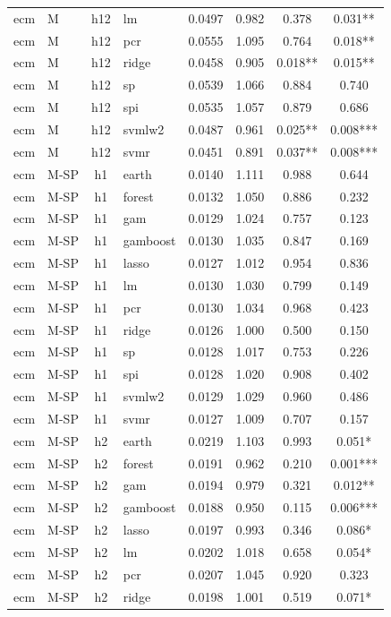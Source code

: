 \begin{ThreePartTable}
\begin{longtable}[t]{llclcccc}
ecm & M & h12 & lm & 0.0497 & 0.982 & 0.378 & 0.031**\\
ecm & M & h12 & pcr & 0.0555 & 1.095 & 0.764 & 0.018**\\
ecm & M & h12 & ridge & 0.0458 & 0.905 & 0.018** & 0.015**\\
ecm & M & h12 & sp & 0.0539 & 1.066 & 0.884 & 0.740\\
ecm & M & h12 & spi & 0.0535 & 1.057 & 0.879 & 0.686\\
ecm & M & h12 & svmlw2 & 0.0487 & 0.961 & 0.025** & 0.008***\\
ecm & M & h12 & svmr & 0.0451 & 0.891 & 0.037** & 0.008***\\
\addlinespace
ecm & M-SP & h1 & earth & 0.0140 & 1.111 & 0.988 & 0.644\\
ecm & M-SP & h1 & forest & 0.0132 & 1.050 & 0.886 & 0.232\\
ecm & M-SP & h1 & gam & 0.0129 & 1.024 & 0.757 & 0.123\\
ecm & M-SP & h1 & gamboost & 0.0130 & 1.035 & 0.847 & 0.169\\
ecm & M-SP & h1 & lasso & 0.0127 & 1.012 & 0.954 & 0.836\\
ecm & M-SP & h1 & lm & 0.0130 & 1.030 & 0.799 & 0.149\\
ecm & M-SP & h1 & pcr & 0.0130 & 1.034 & 0.968 & 0.423\\
ecm & M-SP & h1 & ridge & 0.0126 & 1.000 & 0.500 & 0.150\\
ecm & M-SP & h1 & sp & 0.0128 & 1.017 & 0.753 & 0.226\\
ecm & M-SP & h1 & spi & 0.0128 & 1.020 & 0.908 & 0.402\\
ecm & M-SP & h1 & svmlw2 & 0.0129 & 1.029 & 0.960 & 0.486\\
ecm & M-SP & h1 & svmr & 0.0127 & 1.009 & 0.707 & 0.157\\
\addlinespace
ecm & M-SP & h2 & earth & 0.0219 & 1.103 & 0.993 & 0.051*\\
ecm & M-SP & h2 & forest & 0.0191 & 0.962 & 0.210 & 0.001***\\
ecm & M-SP & h2 & gam & 0.0194 & 0.979 & 0.321 & 0.012**\\
ecm & M-SP & h2 & gamboost & 0.0188 & 0.950 & 0.115 & 0.006***\\
ecm & M-SP & h2 & lasso & 0.0197 & 0.993 & 0.346 & 0.086*\\
ecm & M-SP & h2 & lm & 0.0202 & 1.018 & 0.658 & 0.054*\\
ecm & M-SP & h2 & pcr & 0.0207 & 1.045 & 0.920 & 0.323\\
ecm & M-SP & h2 & ridge & 0.0198 & 1.001 & 0.519 & 0.071*\\

\end{longtable}
\end{ThreePartTable}

